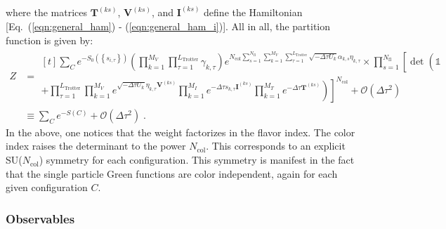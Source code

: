 where the matrices $\bm{T}^{(ks)}$,  $\bm{V}^{(ks)}$, and  $\bm{I}^{(ks)}$ define the Hamiltonian [Eq.~(\ref{eqn:general_ham}) - (\ref{eqn:general_ham_i})].
All in all, the partition function is given by:
\begin{align}\label{eqn:partition_2}
    Z  &=   \begin{multlined}[t]   \sum_{C}   e^{-S_0 \left( \left\{ s_{i,\tau} \right\}  \right) }     \left( \prod_{k=1}^{M_V} \prod_{\tau=1}^{L_{\mathrm{Trotter}}} \gamma_{k,\tau} \right)
    e^{ N_{\mathrm{col}}\sum\limits_{s=1}^{N_{\mathrm{fl}}} \sum\limits_{k=1}^{M_V} \sum\limits_{\tau = 1}^{L_{\mathrm{Trotter}}}\sqrt{-\Delta \tau U_k}  \alpha_{k,s} \eta_{k,\tau} } 
  \times  \prod_{s=1}^{N_{\mathrm{fl}}}\left[\det\left(  \mathds{1}   \phantom{\prod_{k=1}^{M_V}}   \right. \right. \\
   \left. \left.   + \prod_{\tau=1}^{L_{\mathrm{Trotter}}}   
    \prod_{k=1}^{M_V}   e^{  \sqrt{ -\Delta \tau  U_k} \eta_{k,\tau} {\bm V}^{(ks)} }   \prod_{k=1}^{M_I}   e^{  -\Delta \tau s_{k,\tau}  {\bm I}^{(ks)}}  
     \prod_{k=1}^{M_T}   e^{-\Delta \tau {\bm T}^{(ks)}} 
     \right) \right]^{N_{\mathrm{col}}} + \mathcal{O}(\Delta\tau^{2})  \end{multlined} \nonumber \\ 
     & \equiv  \sum_{C} e^{-S(C) } + \mathcal{O}(\Delta\tau^{2})\;.
\end{align}
In the above, one notices that the weight factorizes in  the flavor index. The color index raises the determinant to the power $N_{\mathrm{col}}$. 
This corresponds to  an explicit SU($N_{\mathrm{col}}$) symmetry   for each  configuration. This symmetry is manifest in the fact that the single particle  Green functions are color independent, again for each given  configuration $C$.

\subsubsection{Observables}\label{sec:Observables.General}

